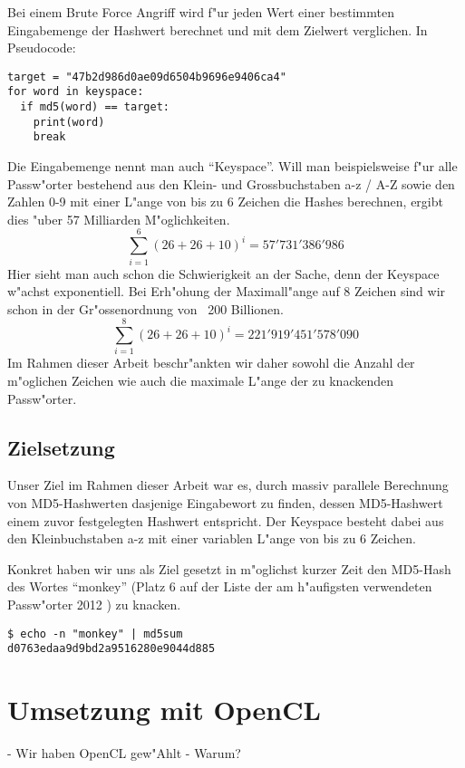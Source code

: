 \begin{refsection}
Bei einem Brute Force Angriff wird f"ur jeden Wert einer bestimmten
Eingabemenge der Hash\-wert berechnet und mit dem Zielwert verglichen. In
Pseudocode:

\begin{verbatim}
target = "47b2d986d0ae09d6504b9696e9406ca4"
for word in keyspace:
  if md5(word) == target:
    print(word)
    break
\end{verbatim}

Die Eingabemenge nennt man auch ``Keyspace''. Will man beispielsweise f"ur alle
Passw"orter bestehend aus den Klein- und Grossbuchstaben a-z / A-Z sowie den
Zahlen 0-9 mit einer L"ange von bis zu 6 Zeichen die Hashes berechnen, ergibt
dies "uber 57 Milliarden M"oglichkeiten.
\[
	\sum_{i=1}^{6} \left(26 + 26 + 10\right)^i = 57'731'386'986
\]
Hier sieht man auch schon die Schwierigkeit an der Sache, denn der Keyspace
w"achst exponentiell. Bei Erh"ohung der Maximall"ange auf 8 Zeichen sind wir schon
in der Gr"ossenordnung von ~200 Billionen.
\[
	\sum_{i=1}^{8} \left(26 + 26 + 10\right)^i = 221'919'451'578'090
\]
Im Rahmen dieser Arbeit beschr"ankten wir daher sowohl die Anzahl der m"oglichen
Zeichen wie auch die maximale L"ange der zu knackenden Passw"orter.

\subsection{Zielsetzung}

Unser Ziel im Rahmen dieser Arbeit war es, durch massiv parallele Berechnung von
MD5-Hashwerten dasjenige Eingabewort zu finden, dessen MD5-Hashwert einem zuvor
festgelegten Hashwert entspricht. Der Keyspace besteht dabei aus den
Kleinbuchstaben a-z mit einer variablen L"ange von bis zu 6 Zeichen.

Konkret haben wir uns als Ziel gesetzt in m"oglichst kurzer Zeit den MD5-Hash
des Wortes ``monkey'' (Platz 6 auf der Liste der am h"aufigsten verwendeten
Passw"orter 2012 \cite{crypto:splash2012}) zu knacken.

\begin{verbatim}
$ echo -n "monkey" | md5sum
d0763edaa9d9bd2a9516280e9044d885
\end{verbatim}

\section{Umsetzung mit OpenCL}

- Wir haben OpenCL gew"Ahlt
- Warum?


\end{refsection}
